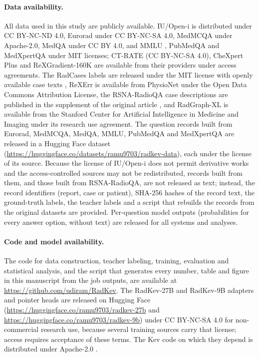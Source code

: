 \documentclass[11pt]{article}
\begin{document}
\paragraph{Data availability.} All data used in this study are publicly available. IU/Open-i \citep{demnerfushman2016iu} is distributed under CC BY-NC-ND 4.0, Eurorad \citep{eurorad,wanglab2025eurorad} under CC BY-NC-SA 4.0, MedMCQA \citep{pal2022medmcqa} under Apache-2.0, MedQA \citep{jin2021medqa} under CC BY 4.0, and MMLU \citep{hendrycks2021mmlu}, PubMedQA \citep{jin2019pubmedqa} and MedXpertQA \citep{zuo2025medxpertqa} under MIT licenses; CT-RATE \citep{hamamci2026ctrate} (CC BY-NC-SA 4.0), CheXpert Plus \citep{chambon2024chexpertplus} and ReXGradient-160K \citep{zhang2025rexgradient} are available from their providers under access agreements. The RadCases labels \citep{yao2025radcases} are released under the MIT license with openly available case texts \citep{chen2024medbullets}, ReXErr \citep{rao2025rexerr} is available from PhysioNet under the Open Data Commons Attribution License, the RSNA-RadioQA case descriptions are published in the supplement of the original article \citep{tayebiarasteh2025radiorag}, and RadGraph-XL \citep{delbrouck2024radgraphxl} is available from the Stanford Center for Artificial Intelligence in Medicine and Imaging under its research use agreement. The question records built from Eurorad, MedMCQA, MedQA, MMLU, PubMedQA and MedXpertQA are released in a Hugging Face dataset (\url{https://huggingface.co/datasets/ramu9703/radkev-data}), each under the license of its source. Because the license of IU/Open-i does not permit derivative works and the access-controlled sources may not be redistributed, records built from them, and those built from RSNA-RadioQA, are not released as text; instead, the record identifiers (report, case or patient), SHA-256 hashes of the record text, the ground-truth labels, the teacher labels and a script that rebuilds the records from the original datasets are provided. Per-question model outputs (probabilities for every answer option, without text) are released for all systems and analyses.

\paragraph{Code and model availability.} The code for data construction, teacher labeling, training, evaluation and statistical analysis, and the script that generates every number, table and figure in this manuscript from the job outputs, are available at \url{https://github.com/udiram/RadKev}. The RadKev-27B and RadKev-9B adapters and pointer heads are released on Hugging Face (\url{https://huggingface.co/ramu9703/radkev-27b} and \url{https://huggingface.co/ramu9703/radkev-9b}) under CC BY-NC-SA 4.0 for non-commercial research use, because several training sources carry that license; access requires acceptance of these terms. The Kev code on which they depend is distributed under Apache-2.0 \citep{palmer2026kev}.
\end{document}
